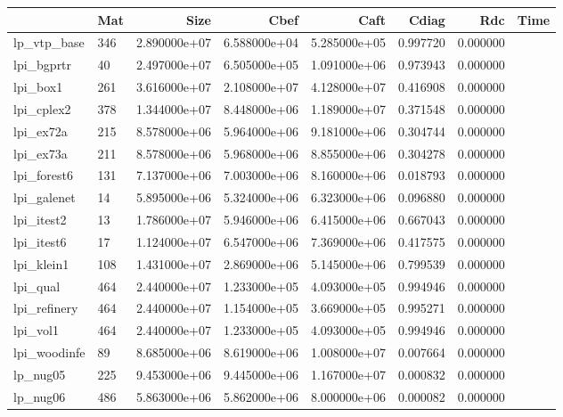 \begin{tabular}{llrrrrrr}
\toprule
{} &                      Mat &  Size &          Cbef &          Caft &         Cdiag &       Rdc &  Time \\
\midrule
lp\_vtp\_base             &  346 &  2.890000e+07 &  6.588000e+04 &  5.285000e+05 &  0.997720 &  0.000000 \\
lpi\_bgprtr              &   40 &  2.497000e+07 &  6.505000e+05 &  1.091000e+06 &  0.973943 &  0.000000 \\
lpi\_box1                &  261 &  3.616000e+07 &  2.108000e+07 &  4.128000e+07 &  0.416908 &  0.000000 \\
lpi\_cplex2              &  378 &  1.344000e+07 &  8.448000e+06 &  1.189000e+07 &  0.371548 &  0.000000 \\
lpi\_ex72a               &  215 &  8.578000e+06 &  5.964000e+06 &  9.181000e+06 &  0.304744 &  0.000000 \\
lpi\_ex73a               &  211 &  8.578000e+06 &  5.968000e+06 &  8.855000e+06 &  0.304278 &  0.000000 \\
lpi\_forest6             &  131 &  7.137000e+06 &  7.003000e+06 &  8.160000e+06 &  0.018793 &  0.000000 \\
lpi\_galenet             &   14 &  5.895000e+06 &  5.324000e+06 &  6.323000e+06 &  0.096880 &  0.000000 \\
lpi\_itest2              &   13 &  1.786000e+07 &  5.946000e+06 &  6.415000e+06 &  0.667043 &  0.000000 \\
lpi\_itest6              &   17 &  1.124000e+07 &  6.547000e+06 &  7.369000e+06 &  0.417575 &  0.000000 \\
lpi\_klein1              &  108 &  1.431000e+07 &  2.869000e+06 &  5.145000e+06 &  0.799539 &  0.000000 \\
lpi\_qual                &  464 &  2.440000e+07 &  1.233000e+05 &  4.093000e+05 &  0.994946 &  0.000000 \\
lpi\_refinery            &  464 &  2.440000e+07 &  1.154000e+05 &  3.669000e+05 &  0.995271 &  0.000000 \\
lpi\_vol1                &  464 &  2.440000e+07 &  1.233000e+05 &  4.093000e+05 &  0.994946 &  0.000000 \\
lpi\_woodinfe            &   89 &  8.685000e+06 &  8.619000e+06 &  1.008000e+07 &  0.007664 &  0.000000 \\
lp\_nug05                &  225 &  9.453000e+06 &  9.445000e+06 &  1.167000e+07 &  0.000832 &  0.000000 \\
lp\_nug06                &  486 &  5.863000e+06 &  5.862000e+06 &  8.000000e+06 &  0.000082 &  0.000000 \\

\end{tabular}
